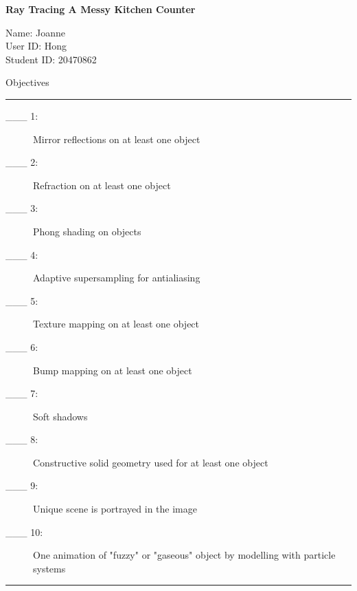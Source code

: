 \documentclass{article}
\newcommand\projecttitle{Ray Tracing A Messy Kitchen Counter}
\newcommand\myname{Joanne}
\newcommand\myuserid{Hong}
\newcommand\mystudentid{20470862}
\begin{document}
\newpage

{\huge \bf 
	\projecttitle 
}

\medskip
Name: \myname \\ 
User ID: \myuserid \\ 
Student ID: \mystudentid 

\bigskip
{\Large Objectives}

\hrule
\begin{description}
    \item[\_\_\_ 1:]  Mirror reflections on at least one object

     \item[\_\_\_ 2:]  Refraction on at least one object

     \item[\_\_\_ 3:]  Phong shading on objects

     \item[\_\_\_ 4:]  Adaptive supersampling for antialiasing

     \item[\_\_\_ 5:]  Texture mapping on at least one object

     \item[\_\_\_ 6:]  Bump mapping on at least one object

     \item[\_\_\_ 7:]  Soft shadows

     \item[\_\_\_ 8:]  Constructive solid geometry used for at least one object

     \item[\_\_\_ 9:]  Unique scene is portrayed in the image

     \item[\_\_\_ 10:]  One animation of "fuzzy" or "gaseous" object by modelling with particle systems
\end{description}

\hrule
\end{document}
